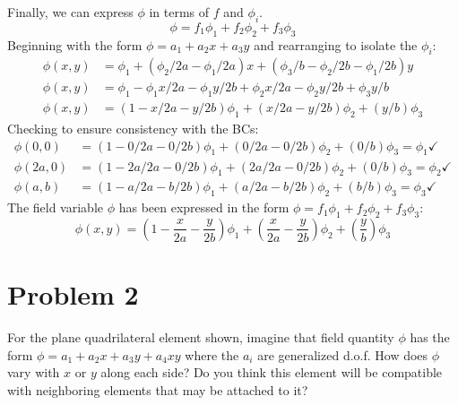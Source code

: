 \documentclass[12pt,letterpaper]{article}
\begin{document}
\begin{enumerate}[label=(\alph*)]
\begin{enumerate}[label=\arabic*.]
			Finally, we can express $\phi$ in terms of $f$ and $\phi_i$.
			\begin{equation*}
				\phi = f_1\phi_1 + f_2\phi_2 + f_3\phi_3
			\end{equation*}			
			Beginning with the form $\phi = a_1 + a_2x + a_3y$ and rearranging to isolate the $\phi_i$:
			\begin{align*}
				\phi(x,y) &= \phi_1 + (\phi_2/2a - \phi_1/2a)x + ( \phi_3/b - \phi_2/2b - \phi_1/2b)y\\
				\phi(x,y) &= \phi_1 -  \phi_1x/2a - \phi_1y/2b + \phi_2x/2a - \phi_2y/2b + \phi_3y/b\\
				\phi(x,y) &=  (1 - x/2a - y/2b)\phi_1 + (x/2a-y/2b) \phi_2 + (y/b)\phi_3
			\end{align*}
			Checking to ensure consistency with the BCs:
			\begin{align*}
				\phi(0,0) &=  (1 - 0/2a - 0/2b)\phi_1 + (0/2a-0/2b) \phi_2 + (0/b)\phi_3 = \phi_1 \checkmark \\
				\phi(2a,0) &= (1 - 2a/2a - 0/2b)\phi_1 + (2a/2a-0/2b) \phi_2 + (0/b)\phi_3 = \phi_2 \checkmark\\
				\phi(a,b) &=  (1 - a/2a - b/2b)\phi_1 + (a/2a-b/2b) \phi_2 + (b/b)\phi_3 = \phi_3 \checkmark
			\end{align*}
			The field variable $\phi$ has been expressed in the form $\phi = f_1\phi_1 + f_2\phi_2 + f_3\phi_3$:
			\begin{equation*}
				\boxed{\phi(x,y) =  \left(1 - \frac{x}{2a} - \frac{y}{2b}\right)\phi_1 + \left(\frac{x}{2a}-\frac{y}{2b}\right) \phi_2 +\left(\frac{y}{b}\right)\phi_3}
			\end{equation*}
		\end{enumerate}
		
	\end{enumerate}


	\newpage
	
	\section*{Problem 2}
	For the plane quadrilateral element shown, imagine that field quantity $\phi$ has the form $\phi = a_1 + a_2x + a_3y + a_4xy$ where the $a_i$ are generalized d.o.f. How does $\phi$ vary with $x$ or $y$ along each side? Do you think this element will be compatible with neighboring elements that may be attached to it?
	
\end{document}
